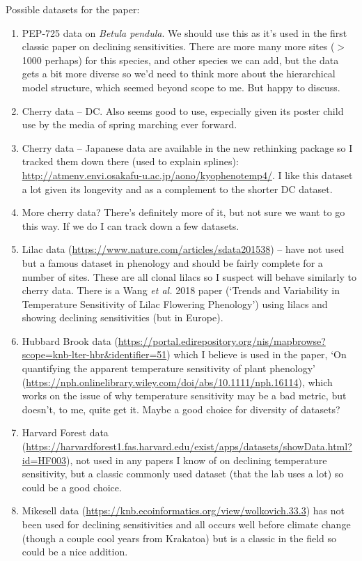 \documentclass[11pt,letter]{article}
\begin{document}

\renewcommand{\refname}{\CHead{}}

Possible datasets for the paper:
\begin{enumerate}
\item PEP-725 data on \emph{Betula pendula}. We should use this as it's used in the first classic paper on declining sensitivities. There are more many more sites ($>$1000 perhaps) for this species, and other species we can add, but the data gets a bit more diverse so we'd need to think more about the hierarchical model structure, which seemed beyond scope to me. But happy to discuss.
\item Cherry data -- DC. Also seems good to use, especially given its poster child use by the media of spring marching ever forward. 
\item Cherry data -- Japanese data are available in the new rethinking package so I tracked them down there (used to explain splines):
\url{http://atmenv.envi.osakafu-u.ac.jp/aono/kyophenotemp4/}. I like this dataset a lot given its longevity and as a complement to the shorter DC dataset.
\item More cherry data? There's definitely more of it, but not sure we want to go this way. If we do I can track down a few datasets. 
\item Lilac data (\url{https://www.nature.com/articles/sdata201538}) -- have not used but a famous dataset in phenology and should be fairly complete for a number of sites. These are all clonal lilacs so I suspect will behave similarly to cherry data. There is a Wang \emph{et al.} 2018 paper (`Trends and Variability in Temperature Sensitivity of Lilac Flowering Phenology') using lilacs and showing declining sensitivities (but in Europe). 
\item Hubbard Brook data (\url{https://portal.edirepository.org/nis/mapbrowse?scope=knb-lter-hbr&identifier=51}) which I believe is used in the paper, `On quantifying the apparent temperature sensitivity of plant phenology' (\url{https://nph.onlinelibrary.wiley.com/doi/abs/10.1111/nph.16114}), which works on the issue of why temperature sensitivity may be a bad metric, but doesn't, to me, quite get it. Maybe a good choice for diversity of datasets?
\item Harvard Forest data (\url{https://harvardforest1.fas.harvard.edu/exist/apps/datasets/showData.html?id=HF003}), not used in any papers I know of on declining temperature sensitivity, but a classic commonly used dataset (that the lab uses a lot) so could be a good choice.
\item Mikesell data (\url{https://knb.ecoinformatics.org/view/wolkovich.33.3}) has not been used for declining sensitivities and all occurs well before climate change (though a couple cool years from Krakatoa) but is a classic in the field so could be a nice addition.
\end{enumerate}
\end{document}
